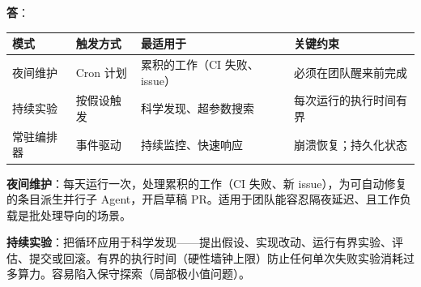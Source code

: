 \begin{questionbox}
\textbf{答}：

\begin{tabular}{@{}lp{3.5cm}p{3.5cm}p{4cm}@{}}
\toprule
\textbf{模式} & \textbf{触发方式} & \textbf{最适用于} & \textbf{关键约束} \\
\midrule
夜间维护 & Cron 计划 & 累积的工作（CI 失败、issue） & 必须在团队醒来前完成 \\
持续实验 & 按假设触发 & 科学发现、超参数搜索 & 每次运行的执行时间有界 \\
常驻编排器 & 事件驱动 & 持续监控、快速响应 & 崩溃恢复；持久化状态 \\
\bottomrule
\end{tabular}

\textbf{夜间维护}：每天运行一次，处理累积的工作（CI 失败、新 issue），为可自动修复的条目派生并行子 Agent，开启草稿 PR。适用于团队能容忍隔夜延迟、且工作负载是批处理导向的场景。

\textbf{持续实验}：把循环应用于科学发现——提出假设、实现改动、运行有界实验、评估、提交或回滚。有界的执行时间（硬性墙钟上限）防止任何单次失败实验消耗过多算力。容易陷入保守探索（局部极小值问题）。


\end{questionbox}
